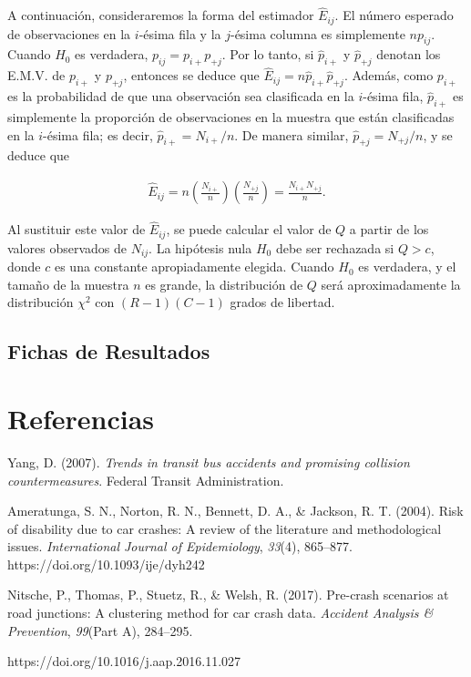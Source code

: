 \documentclass{book}
\begin{document}
A continuación, consideraremos la forma del estimador $\hat{E}_{ij}$. El número esperado de observaciones en la $i$-ésima fila y la $j$-ésima columna es simplemente $np_{ij}$. Cuando $H_0$ es verdadera, $p_{ij} = p_{i+}p_{+j}$. Por lo tanto, si $\hat{p}_{i+}$ y $\hat{p}_{+j}$ denotan los E.M.V. de $p_{i+}$ y $p_{+j}$, entonces se deduce que $\hat{E}_{ij} = n\hat{p}_{i+}\hat{p}_{+j}$. Además, como $p_{i+}$ es la probabilidad de que una observación sea clasificada en la $i$-ésima fila, $\hat{p}_{i+}$ es simplemente la proporción de observaciones en la muestra que están clasificadas en la $i$-ésima fila; es decir, $\hat{p}_{i+} = N_{i+}/n$. De manera similar, $\hat{p}_{+j} = N_{+j}/n$, y se deduce que

\begin{align}
\hat{E}_{ij} = n\left(\frac{N_{i+}}{n}\right)\left(\frac{N_{+j}}{n}\right) = \frac{N_{i+}N_{+j}}{n}.
\end{align}

Al sustituir este valor de $\hat{E}_{ij}$, se puede calcular el valor de $Q$ a partir de los valores observados de $N_{ij}$. La hipótesis nula $H_0$ debe ser rechazada si $Q > c$, donde $c$ es una constante apropiadamente elegida. Cuando $H_0$ es verdadera, y el tamaño de la muestra $n$ es grande, la distribución de $Q$ será aproximadamente la distribución $\chi^2$ con $(R - 1)(C - 1)$ grados de libertad.

\subsection{Fichas de Resultados}






\section*{Referencias}

Yang, D. (2007). \textit{Trends in transit bus accidents and promising collision countermeasures}. Federal Transit Administration.

Ameratunga, S. N., Norton, R. N., Bennett, D. A., \& Jackson, R. T. (2004). Risk of disability due to car crashes: A review of the literature and methodological issues. \textit{International Journal of Epidemiology}, \textit{33}(4), 865--877. https://doi.org/10.1093/ije/dyh242

Nitsche, P., Thomas, P., Stuetz, R., \& Welsh, R. (2017). Pre-crash scenarios at road junctions: A clustering method for car crash data. \textit{Accident Analysis \& Prevention}, \textit{99}(Part A), 284--295. 

https://doi.org/10.1016/j.aap.2016.11.027
\end{document}
